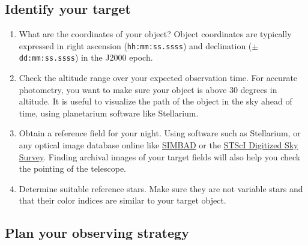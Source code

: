 \documentclass{article}
\begin{document}
	\subsection{Identify your target}
	\label{sec:identify-your-target}
	
	\begin{enumerate}
		
		\item What are the coordinates of your object? Object coordinates are typically expressed in right ascension (\texttt{hh:mm:ss.ssss}) and declination (\texttt{$\pm$dd:mm:ss.ssss}) in the J2000 epoch.
		
		\item Check the altitude range over your expected observation time. For accurate photometry, you want to make sure your object is above 30 degrees in altitude. It is useful to visualize the path of the object in the sky ahead of time, using planetarium software like Stellarium.
		
		\item Obtain a reference field for your night. Using software such as Stellarium, or any optical image database online like \href{http://simbad.u-strasbg.fr/simbad/}{SIMBAD} or the \href{https://archive.stsci.edu/cgi-bin/dss_form}{STScI Digitized Sky Survey}. Finding archival images of your target fields will also help you check the pointing of the telescope.
		
		\item Determine suitable reference stars. Make sure they are not variable stars and that their color indices are similar to your target object.
		
	\end{enumerate}
	
	\subsection{Plan your observing strategy}
	\label{sec:plan-your-observing-strategy}
	
\end{document}

